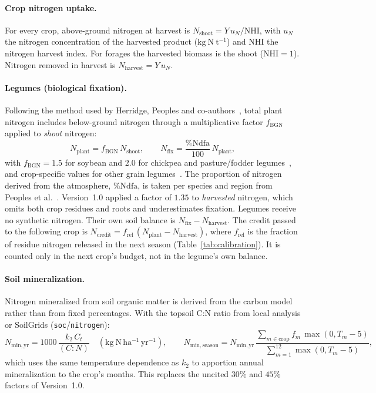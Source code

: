 \paragraph{Crop nitrogen uptake.} For every crop, above-ground nitrogen at harvest is $N_{\mathrm{shoot}} = Y\, u_N / \mathrm{NHI}$, with $u_N$ the nitrogen concentration of the harvested product ($\mathrm{kg~N~t^{-1}}$) and $\mathrm{NHI}$ the nitrogen harvest index. For forages the harvested biomass is the shoot ($\mathrm{NHI} = 1$). Nitrogen removed in harvest is $N_{\mathrm{harvest}} = Y\, u_N$.

\paragraph{Legumes (biological fixation).} Following the method used by Herridge, Peoples and co-authors~\cite{herridge2008global,unkovich2008measuring,herridge2022quantifying}, total plant nitrogen includes below-ground nitrogen through a multiplicative factor $f_{\mathrm{BGN}}$ applied to \emph{shoot} nitrogen:
\begin{equation}
  N_{\mathrm{plant}} = f_{\mathrm{BGN}}\, N_{\mathrm{shoot}}, \qquad
  N_{\mathrm{fix}} = \frac{\%\mathrm{Ndfa}}{100}\, N_{\mathrm{plant}},
\end{equation}
with $f_{\mathrm{BGN}} = 1.5$ for soybean and $2.0$ for chickpea and pasture/fodder legumes~\cite{unkovich2008measuring}, and crop-specific values for other grain legumes~\cite{herridge2022quantifying}. The proportion of nitrogen derived from the atmosphere, $\%\mathrm{Ndfa}$, is taken per species and region from Peoples et al.~\cite{peoples2021quantifying}. Version~1.0 applied a factor of $1.35$ to \emph{harvested} nitrogen, which omits both crop residues and roots and underestimates fixation. Legumes receive no synthetic nitrogen. Their own soil balance is $N_{\mathrm{fix}} - N_{\mathrm{harvest}}$. The credit passed to the following crop is $N_{\mathrm{credit}} = f_{\mathrm{rel}}\,(N_{\mathrm{plant}} - N_{\mathrm{harvest}})$, where $f_{\mathrm{rel}}$ is the fraction of residue nitrogen released in the next season (Table~\ref{tab:calibration}). It is counted only in the next crop's budget, not in the legume's own balance.

\paragraph{Soil mineralization.} Nitrogen mineralized from soil organic matter is derived from the carbon model rather than from fixed percentages. With the topsoil C:N ratio from local analysis or SoilGrids (\texttt{soc}/\texttt{nitrogen}):
\begin{equation}
  N_{\mathrm{min,yr}} = 1000\, \frac{k_2\, C_t}{(C{:}N)} \quad (\mathrm{kg~N\,ha^{-1}\,yr^{-1}}), \qquad
  N_{\mathrm{min,season}} = N_{\mathrm{min,yr}}\, \frac{\sum_{m \in \mathrm{crop}} f_m\, \max(0, T_m - 5)}{\sum_{m=1}^{12} \max(0, T_m - 5)},
\end{equation}
which uses the same temperature dependence as $k_2$ to apportion annual mineralization to the crop's months. This replaces the uncited $30\%$ and $45\%$ factors of Version~1.0.

